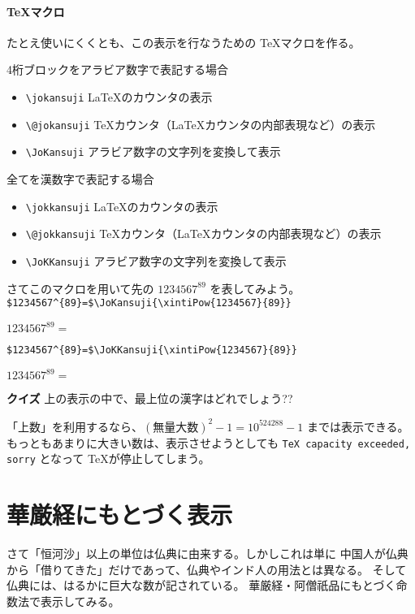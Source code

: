 \documentclass[dvipdfmx]{jsarticle}
\begin{document}
\paragraph{\TeX マクロ}
たとえ使いにくくとも、この表示を行なうための \TeX マクロを作る。
\begin{itembox}[l]{4桁ブロックをアラビア数字で表記する場合}
\begin{itemize}
\item \verb+\jokansuji+ \LaTeX のカウンタの表示
\item \verb+\@jokansuji+ \TeX カウンタ（\LaTeX カウンタの内部表現など）の表示
\item \verb+\JoKansuji+ アラビア数字の文字列を変換して表示
\end{itemize}  
\end{itembox}
\begin{itembox}[l]{全てを漢数字で表記する場合}
\begin{itemize}
\item \verb+\jokkansuji+ \LaTeX のカウンタの表示
\item \verb+\@jokkansuji+ \TeX カウンタ（\LaTeX カウンタの内部表現など）の表示
\item \verb+\JoKKansuji+ アラビア数字の文字列を変換して表示
\end{itemize}  
\end{itembox}
さてこのマクロを用いて先の $1234567^{89}$ を表してみよう。
\newpage
\noindent\verb+$1234567^{89}=$\JoKansuji{\xintiPow{1234567}{89}}+\par
$1234567^{89}=$
\medskip\par
\noindent\verb+$1234567^{89}=$\JoKKansuji{\xintiPow{1234567}{89}}+\par
$1234567^{89}=$
\par
\begin{itembox}[l]{\bfseries クイズ}
  \centering
  上の表示の中で、最上位の漢字はどれでしょう??  
\end{itembox}
\par\medskip\noindent
「上数」を利用するなら、$(\text{無量大数})^2-1=10^{524288}-1$ までは表示できる。
もっともあまりに大きい数は、表示させようとしても \verb+TeX capacity exceeded, sorry+
となって \TeX\space が停止してしまう。
\def\thesection{第\kegonknumeral{section}話}
\section{華厳経にもとづく表示}
さて「恒河沙」以上の単位は仏典に由来する。しかしこれは単に
中国人が仏典から「借りてきた」だけであって、仏典やインド人の用法とは異なる。
そして仏典には、はるかに巨大な数が記されている。
華厳経・阿僧祇品にもとづく命数法で表示してみる。
\end{document}
